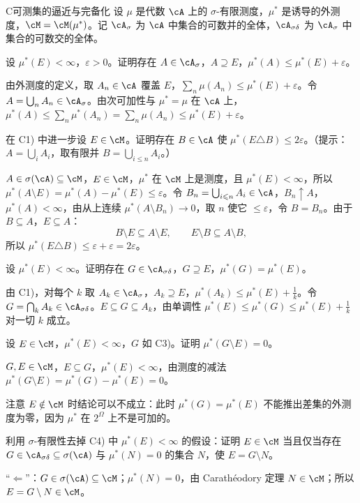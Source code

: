 \begin{probleme}{C}{可测集的逼近与完备化}
设 $\mu$ 是代数 $\cA$ 上的 $\sigma$-有限测度，$\mu^*$ 是诱导的外测度，$\cM=\cM(\mu^*)$。记 $\cA_\sigma$ 为 $\cA$ 中集合的可数并的全体，$\cA_{\sigma\delta}$ 为 $\cA_\sigma$ 中集合的可数交的全体。
\begin{questions}
\item 设 $\mu^*(E)<\infty$，$\varepsilon>0$。证明存在 $A\in\cA_\sigma$，$A\supseteq E$，$\mu^*(A)\leqslant\mu^*(E)+\varepsilon$。
\begin{solution}
由外测度的定义，取 $A_n\in\cA$ 覆盖 $E$，$\sum_n\mu(A_n)\leqslant\mu^*(E)+\varepsilon$。令 $A=\bigcup_nA_n\in\cA_\sigma$。由次可加性与 $\mu^*=\mu$ 在 $\cA$ 上，$\mu^*(A)\leqslant\sum_n\mu^*(A_n)=\sum_n\mu(A_n)\leqslant\mu^*(E)+\varepsilon$。
\end{solution}
\item 在 C1) 中进一步设 $E\in\cM$。证明存在 $B\in\cA$ 使 $\mu^*(E\triangle B)\leqslant2\varepsilon$。（提示：$A=\bigcup_iA_i$，取有限并 $B=\bigcup_{i\leqslant n}A_i$。）
\begin{solution}
$A\in\sigma(\cA)\subseteq\cM$，$E\in\cM$，$\mu^*$ 在 $\cM$ 上是测度，且 $\mu^*(E)<\infty$，所以 $\mu^*(A\setminus E)=\mu^*(A)-\mu^*(E)\leqslant\varepsilon$。令 $B_n=\bigcup_{i\leqslant n}A_i\in\cA$，$B_n\uparrow A$，$\mu^*(A)<\infty$，由从上连续 $\mu^*(A\setminus B_n)\to0$，取 $n$ 使它 $\leqslant\varepsilon$，令 $B=B_n$。由于 $B\subseteq A$，$E\subseteq A$：
\[
B\setminus E\subseteq A\setminus E,\qquad E\setminus B\subseteq A\setminus B,
\]
所以 $\mu^*(E\triangle B)\leqslant\varepsilon+\varepsilon=2\varepsilon$。
\end{solution}
\item 设 $\mu^*(E)<\infty$。证明存在 $G\in\cA_{\sigma\delta}$，$G\supseteq E$，$\mu^*(G)=\mu^*(E)$。
\begin{solution}
由 C1)，对每个 $k$ 取 $A_k\in\cA_\sigma$，$A_k\supseteq E$，$\mu^*(A_k)\leqslant\mu^*(E)+\frac1k$。令 $G=\bigcap_kA_k\in\cA_{\sigma\delta}$。$E\subseteq G\subseteq A_k$，由单调性 $\mu^*(E)\leqslant\mu^*(G)\leqslant\mu^*(E)+\frac1k$ 对一切 $k$ 成立。
\end{solution}
\item 设 $E\in\cM$，$\mu^*(E)<\infty$，$G$ 如 C3)。证明 $\mu^*(G\setminus E)=0$。
\begin{solution}
$G,E\in\cM$，$E\subseteq G$，$\mu^*(E)<\infty$，由测度的减法 $\mu^*(G\setminus E)=\mu^*(G)-\mu^*(E)=0$。

注意 $E\notin\cM$ 时结论可以不成立：此时 $\mu^*(G)=\mu^*(E)$ 不能推出差集的外测度为零，因为 $\mu^*$ 在 $2^\Omega$ 上不是可加的。
\end{solution}
\item 利用 $\sigma$-有限性去掉 C4) 中 $\mu^*(E)<\infty$ 的假设：证明 $E\in\cM$ 当且仅当存在 $G\in\cA_{\sigma\delta}\subseteq\sigma(\cA)$ 与 $\mu^*(N)=0$ 的集合 $N$，使 $E=G\setminus N$。
\begin{solution}
“$\Leftarrow$”：$G\in\sigma(\cA)\subseteq\cM$；$\mu^*(N)=0$，由 Carathéodory 定理 $N\in\cM$；所以 $E=G\setminus N\in\cM$。


\end{solution}
\end{questions}
\end{probleme}
